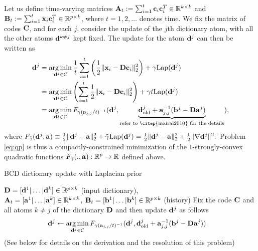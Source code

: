 Let us define time-varying matrices $\mathbf{A}_t := \sum_{i=1}^t\mathbf{c}_i\mathbf{c}_i^T \in \mathbb R^{k \times k}$ and $\mathbf{B}_t := \sum_{i=1}^t\mathbf{x}_i\mathbf{c}_i^T \in \mathbb R^{p \times k}$, where $t=1,2,\ldots$ denotes time. We fix the matrix of codes $\mathbf{C}$, and for each $j$, consider the update of the $j$th dictionary atom, with all the other atoms $\mathbf{d}^{k\ne j}$
kept fixed. The update for the atom $\mathbf{d}^j$ can then be written as
\begin{eqnarray}
  \label{eq:qp}
\begin{split}
  \B{d}^j &= \argmin_{\B{d}^j \in \mathcal C}\frac{1}{t}\sum_{i=1}^t\left(\frac{1}{2}\|\B{x}_i
  -\B{D}\B{c}_i\|_{2}^2\right) + \gamma{\text{Lap}}(\B{d}^j)\\
  &=\argmin_{\B{d}^j \in \mathcal C}\left(\sum_{i=1}^t\frac{1}{2}\|\B{x}_i -\B{D}\B{c}_i\|_{2}^2\right)
  + \gamma t{\text{Lap}}(\B{d}^j)\\
  &=\argmin_{\B{d}^j \in \mathcal C}F_{\gamma (\B{a}_{j,j}/t)^{-1}}(\B{d}^j, \underbrace{\B{d}^j_{\text{old}} + \B{a}_{j,j}^{-1}(\B{b}^j - \B{D}\B{a}^j)}_{\text{refer to   \citep{mairal2010} for the details}}),
\end{split}
\end{eqnarray}
where
$F_{\tilde{\gamma}}(\mathbf{d}^j,\mathbf{a}) \equiv \frac{1}{2}\|\mathbf{d}^j - \mathbf{a}\|_2^2
  + \tilde{\gamma}{\text{Lap}}(\mathbf{d}^j) = \frac{1}{2}\|\mathbf{d}^j - \mathbf{a}\|_2^2
  + \frac{1}{2}\|\nabla \mathbf{d}^j\|^2.
$
Problem \eqref{eq:qp} is thus a compactly-constrained minimization of the $1$-strongly-convex quadratic functions $F_{\tilde{\gamma}}(.,\mathbf{a}): \mathbb R^p \rightarrow \mathbb R$ defined above. 
\begin{algorithm}
  \caption{BCD dictionary update with Laplacian prior}
  \label{Tab:algo_sobdict}
  \begin{algorithmic}[1]
    \Require $\mathbf{D} = [\mathbf{d}^1|\ldots|\mathbf{d}^k] \in \mathbb{R}^{p \times k}$ (input
    dictionary),\\
    $\mathbf{A}_t = [\mathbf{a}^1|\ldots|\mathbf{a}^k] \in \mathbb R^{k \times k}$, $\mathbf{B}_t =
    [\mathbf{b}^1|\ldots|\mathbf{b}^k] \in \mathbb R^{p \times k}$ (history)
    \State Fix the code $\mathbf{C}$ and all atoms $k \ne j$ of the
    dictionary $\mathbf{D}$ and then update $\mathbf{d}^j$ as follows
    \begin{eqnarray}
      \begin{split}
        \mathbf{d}^j &\leftarrow \operatorname*{arg\,min}_{\mathbf{d}^j \in \mathcal C}F_{\gamma (\mathbf{a}_{j,j}/t)^{-1}}(\mathbf{d}^j, \mathbf{d}^j_{\text{old}} + \mathbf{a}_{j,j}^{-1}(\mathbf{b}^j - \mathbf{D}\mathbf{a}^j))
      \end{split}
                  \label{eq:v_sob}
    \end{eqnarray}
    \hspace{1.6cm}(See below for details on the derivation and the resolution of this problem)
    \EndFor
    \EndWhile
  \end{algorithmic}
\end{algorithm}
